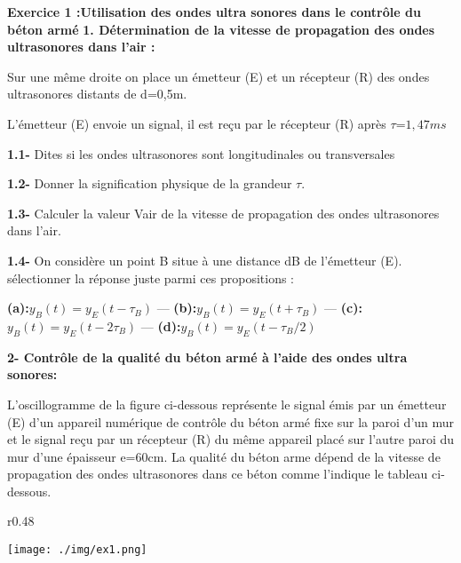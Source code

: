 \documentclass[12pt, french]{article}
\begin{document}
\begin{center}
\end{center}

\vspace{-0.2cm}



\begin{Box2}{\textbf{Exercice 1 :Utilisation des ondes ultra sonores dans le contrôle du béton armé  }
	}
	   \textbf{1. Détermination de la vitesse de propagation des ondes ultrasonores dans l’air :}

	   Sur une même droite on place un émetteur (E) et un récepteur (R) des ondes ultrasonores
distants de d=0,5m.

L’émetteur (E) envoie un signal, il est reçu par le récepteur (R) après $\tau$=$1,47ms$

\textbf{1.1- }Dites si les ondes ultrasonores sont longitudinales ou transversales

\textbf{1.2- }Donner la signification physique de la grandeur $\tau$.

\textbf{1.3- }Calculer la valeur Vair de la vitesse de propagation des ondes ultrasonores dans l’air.

\textbf{1.4- }On considère un point B situe à une distance dB de l’émetteur (E). sélectionner la réponse
juste parmi ces propositions :

\textbf{(a):}$y_B(t)=y_E(t-\tau_B)$ --- \textbf{(b):}$y_B(t)=y_E(t+\tau_B)$ --- \textbf{(c):}$y_B(t)=y_E(t-2\tau_B)$ --- \textbf{(d):}$y_B(t)=y_E(t-\tau_B/2)$


\textbf{2- Contrôle de la qualité du béton armé à l’aide des ondes ultra sonores:}

L’oscillogramme de la figure ci-dessous représente le signal émis par un émetteur (E) d’un
appareil numérique de contrôle du béton armé fixe sur la paroi d’un mur et le signal reçu par
un récepteur (R) du même appareil placé sur l’autre paroi du mur d’une épaisseur e=60cm.
La qualité du béton arme dépend de la vitesse de propagation des ondes ultrasonores dans ce
béton comme l’indique le tableau ci-dessous.
\begin{wrapfigure}[2]{r}{0.48\textwidth}
  \begin{center}
	  \vspace{-1cm}
	\texttt{[image: ./img/ex1.png]}
  \end{center}
\end{wrapfigure}


\end{Box2}
\end{document}

